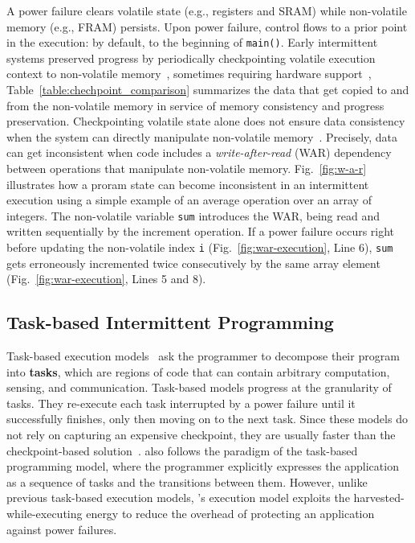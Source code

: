 A power failure clears volatile state (e.g., registers and SRAM) while non-volatile memory (e.g., FRAM) persists. Upon power failure, control flows to a prior point in the execution: by default, to the beginning of {\tt main()}. Early intermittent systems preserved progress by periodically checkpointing volatile execution context to non-volatile memory~\cite{mementos}, sometimes requiring hardware support~\cite{mottola2017harvos,hibernusplusplus,hibernus,idetic,quickrecall}, Table~\ref{table:chechpoint_comparison} summarizes the data that get copied to and from the non-volatile memory in service of memory consistency and progress preservation. Checkpointing volatile state alone does not ensure data consistency when the system can directly manipulate non-volatile memory~\cite{mspcdino}. Precisely, data can get inconsistent when code includes a \emph{write-after-read} (WAR) dependency between operations that manipulate non-volatile memory. Fig.~\ref{fig:w-a-r} illustrates how a proram state can become inconsistent in an intermittent execution using a simple example of an average operation over an array of integers.
The non-volatile variable \texttt{sum} introduces the WAR, being read and written sequentially by the increment operation. If a power failure occurs right before updating the non-volatile index \texttt{i} (Fig.~\ref{fig:war-execution}, Line 6), \texttt{sum} gets erroneously incremented twice consecutively by the same array element (Fig.~\ref{fig:war-execution}, Lines 5 and 8).

\subsection{Task-based Intermittent Programming}
\label{section:background_task_computing}

Task-based execution models~\cite{dino,chain,alpaca} ask the programmer to decompose their program into \textbf{tasks}, which are regions of code that can contain arbitrary computation, sensing, and communication. Task-based models progress at the granularity of tasks. They re-execute each task interrupted by a power failure until it successfully finishes, only then moving on to the next task. Since these models do not rely on capturing an expensive checkpoint, they are usually faster than the checkpoint-based solution~\cite{chain, alpaca}.  \sys also follows the paradigm of the task-based programming model, where the programmer explicitly expresses the application as a sequence of tasks and the transitions between them. However, unlike previous task-based execution models, \sys{}'s execution model exploits the harvested-while-executing energy to reduce the overhead of protecting an application against power failures. 

